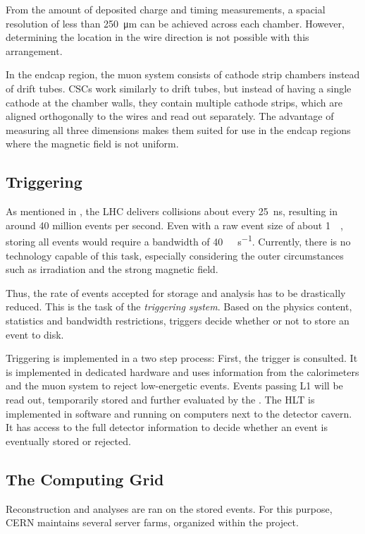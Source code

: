 From the amount of deposited charge and timing measurements, a spacial resolution of less than \SI{250}{\micro\meter} can be achieved across each chamber. However, determining the location in the wire direction is not possible with this arrangement.

In the endcap region, the muon system consists of cathode strip chambers instead of drift tubes. \acp{CSC} work similarly to drift tubes, but instead of having a single cathode at the chamber walls, they contain multiple cathode strips, which are aligned orthogonally to the wires and read out separately.
The advantage of measuring all three dimensions makes them suited for use in the endcap regions where the magnetic field is not uniform. 


\subsection{Triggering}
As mentioned in , the \ac{LHC} delivers collisions about every \SI{25}{\nano\second}, resulting in around \num{40} million events per second. Even with a raw event size of about \SI{1}{\mega\byte}, storing all events would require a bandwidth of \SI{40}{\tera\byte\per\second}. Currently, there is no technology capable of this task, especially considering the outer circumstances such as irradiation and the strong magnetic field.

Thus, the rate of events accepted for storage and analysis has to be drastically reduced. This is the task of the \emph{triggering system}. Based on the physics content, statistics and bandwidth restrictions, triggers decide whether or not to store an event to disk.

Triggering is implemented in a two step process: First, the  trigger is consulted. It is implemented in dedicated hardware and uses information from the calorimeters and the muon system to reject low-energetic events. Events passing \ac{L1} will be read out, temporarily stored and further evaluated by the . The \ac{HLT} is implemented in software and running on computers next to the detector cavern. It has access to the full detector information to decide whether an event is eventually stored or rejected.

\subsection{The Computing Grid}
Reconstruction and analyses are ran on the stored events. For this purpose, \ac{CERN} maintains several server farms, organized within the  project.

